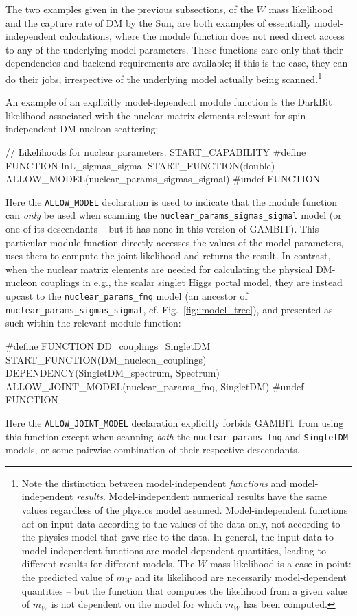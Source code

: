 \documentclass[pdftex,twocolumn,epjc3_preprint,runningheads]{svjour3}
\renewcommand{\_}{\discretionary{\underscore}{}{\underscore}}
\newcommand\cpp[1]{{\lstinline!#1!}}  %
\newcommand{\gambit}{\textsf{GAMBIT}\xspace}
\newcommand{\darkbit}{\textsf{DarkBit}\xspace}
\newcommand{\GB}{\gambit}
\begin{document}
The two examples given in the previous subsections, of the $W$ mass likelihood and the capture rate of DM by the Sun, are both examples of essentially model-independent calculations, where the module function does not need direct access to any of the underlying model parameters.  These functions care only that their dependencies and backend requirements are available; if this is the case, they can do their jobs, irrespective of the underlying model actually being scanned.\footnote{Note the distinction between model-independent \textit{functions} and model-independent \textit{results}.  Model-independent numerical results have the same values regardless of the physics model assumed.  Model-independent functions act on input data according to the values of the data only, not according to the physics model that gave rise to the data.  In general, the input data to model-independent functions are model-dependent quantities, leading to different results for different models. The $W$ mass likelihood is a case in point: the predicted value of $m_W$ and its likelihood are necessarily model-dependent quantities -- but the function that computes the likelihood from a given value of $m_W$ is not dependent on the model for which $m_W$ has been computed.}

An example of an explicitly model-dependent module function is the \darkbit likelihood associated with the nuclear matrix elements relevant for spin-independent DM-nucleon scattering:
\begin{lstcpp}
// Likelihoods for nuclear parameters.
START_CAPABILITY
  #define FUNCTION lnL_sigmas_sigmal
    START_FUNCTION(double)
    ALLOW_MODEL(nuclear_params_sigmas_sigmal)
  #undef FUNCTION
\end{lstcpp}
Here the \cpp{ALLOW_MODEL} declaration is used to indicate that the module function can \textit{only} be used when scanning the \cpp{nuclear_params_sigmas_sigmal} model (or one of its descendants -- but it has none in this version of \GB).  This particular module function directly accesses the values of the model parameters, uses them to compute the joint likelihood and returns the result.  In contrast, when the nuclear matrix elements are needed for calculating the physical DM-nucleon couplings in e.g., the scalar singlet Higgs portal model, they are instead upcast to the \cpp{nuclear_params_fnq} model (an ancestor of \cpp{nuclear_params_sigmas_sigmal}, cf. Fig.\ \ref{fig::model_tree}), and presented as such within the relevant module function:
\begin{lstcpp}
#define FUNCTION DD_couplings_SingletDM
  START_FUNCTION(DM_nucleon_couplings)
  DEPENDENCY(SingletDM_spectrum, Spectrum)
  ALLOW_JOINT_MODEL(nuclear_params_fnq, SingletDM)
#undef FUNCTION
\end{lstcpp}
Here the \cpp{ALLOW_JOINT_MODEL} declaration explicitly forbids \GB from using this function except when scanning \textit{both} the \cpp{nuclear_params_fnq} and \cpp{SingletDM} models, or some pairwise combination of their respective descendants.
\end{document}
